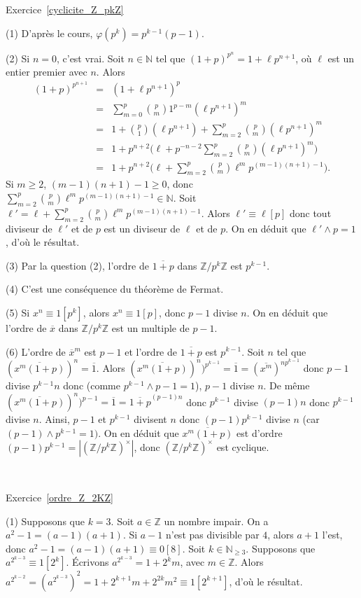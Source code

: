 \documentclass[11pt,a4paper]{article}
\newcommand{\N}{\mathbb{N}}
\newcommand{\Z}{\mathbb{Z}}
\begin{document}
Exercice~\ref{cyclicite_Z_pkZ}

(1) D'après le cours, $\varphi(p^k)=p^{k-1}(p-1)$.

(2) Si $n=0$, c'est vrai. Soit $n\in \N$ tel que $(1+p)^{p^n}=1+\ell p^{n+1}$, où $\ell$ est un entier premier avec $n$. Alors \[\begin{aligned} (1+p)^{p^{n+1}}&=&(1+\ell p^{n+1})^{p}\\ &=&\sum_{m=0}^p \binom{p}{m}1^{p-m}(\ell p^{n+1})^m
\\ &=& 1+\binom{p}{1}(\ell p^{n+1})+\sum_{m=2}^p\binom{p}{m}(\ell p^{n+1})^m\\ &=& 1+p^{n+2}\big(\ell +p^{-n-2}\sum_{m=2}^p\binom{p}{m} (\ell p^{n+1})^m\big)\\ 
&=& 1+p^{n+2}\big(\ell +\sum_{m=2}^p\binom{p}{m} \ell^m p^{(m-1)(n+1)-1}\big).\end{aligned}\] Si $m\geq 2$, $(m-1)(n+1)-1\geq 0$, donc $\sum_{m=2}^p\binom{p}{m} \ell^m p^{(m-1)(n+1)-1}\in \N$. Soit $\ell'=\ell +\sum_{m=2}^p\binom{p}{m} \ell^m p^{(m-1)(n+1)-1}$. Alors $\ell'\equiv \ell[p]$ donc tout diviseur de $\ell'$ et de $p$ est un diviseur de $\ell$ et de $p$. On en déduit que $\ell'\wedge p=1$, d'où le résultat.

(3) Par la question (2), l'ordre de $\overline{1+p}$ dans $\Z/p^k\Z$ est $p^{k-1}$. 

(4) C'est une conséquence du théorème de Fermat.

(5) Si $x^n\equiv 1[p^k]$, alors $x^n\equiv 1[p]$, donc $p-1$ divise $n$. On en déduit que l'ordre de $\overline{x}$ dans $\Z/p^k\Z$ est un multiple de $p-1$. 

(6) L'ordre de $\overline{x}^m$ est $p-1$ et l'ordre de $\overline{1+p}$ est $p^{k-1}$. Soit $n$ tel que $(\overline{x^m(1+p)})^n=\overline{1}$. Alors $(\overline{x^m(1+p)})^n)^{p^{k-1}}=\overline{1}=(\overline{x^m})^{np^{k-1}}$ donc $p-1$ divise  $p^{k-1}n$ donc (comme $p^{k-1}\wedge p-1=1$), $p-1$ divise $n$. De même $(\overline{x^m(1+p)})^n)^{p-1}=\overline{1}=\overline{1+p}^{(p-1)n}$ donc $p^{k-1}$ divise $(p-1)n$ donc $p^{k-1}$ divise $n$. Ainsi, $p-1$ et $p^{k-1}$ divisent $n$ donc $(p-1)p^{k-1}$ divise $n$ (car $(p-1)\wedge p^{k-1}=1)$. On en déduit que $\overline{x^m(1+p)}$ est d'ordre $(p-1)p^{k-1}=|(\Z/p^k\Z)^\times|$, donc $(\Z/p^k\Z)^\times$ est cyclique.


\


Exercice~\ref{ordre_Z_2KZ}

(1) Supposons que $k=3$. Soit $a\in \Z$ un nombre impair. On a  $a^2-1=(a-1)(a+1)$. Si $a-1$ n'est pas divisible par $4$, alors $a+1$ l'est, donc $a^2-1=(a-1)(a+1)\equiv 0[8]$. Soit $k\in \N_{\geq 3}$. Supposons que $a^{2^{k-3}}\equiv 1[2^k]$. Écrivons $a^{2^{k-3}}=1+2^k m$, avec $m\in \Z$. Alors $a^{2^{k-2}}=(a^{2^{k-3}})^2=1+2^{k+1}m+2^{2k}m^2\equiv 1[2^{k+1}]$, d'où le résultat.
\end{document}
